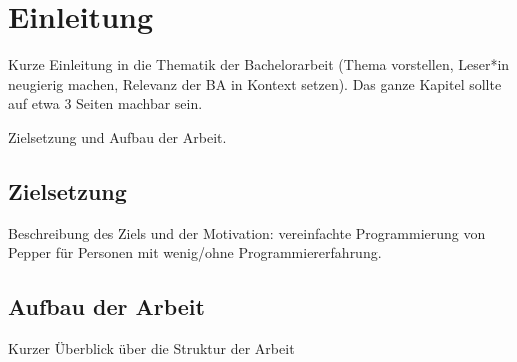 \chapter{Einleitung} %
Kurze Einleitung in die Thematik der Bachelorarbeit (Thema vorstellen, Leser*in neugierig machen, Relevanz der BA in Kontext setzen).
Das ganze Kapitel sollte auf etwa 3 Seiten machbar sein.

Zielsetzung und Aufbau der Arbeit.

\section{Zielsetzung} %
Beschreibung des Ziels und der Motivation: vereinfachte Programmierung von Pepper für Personen mit wenig/ohne Programmiererfahrung.

\section{Aufbau der Arbeit} %
Kurzer Überblick über die Struktur der Arbeit